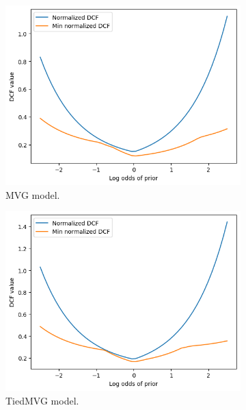 \documentclass{article}
\begin{document}
\begin{figure}[ht]
    \centering
    \begin{subfigure}[b]{0.3\textwidth}
        \centering
        \includegraphics[width=\textwidth]{images/bayes_error_mvg.png}
        \caption{MVG model.}
    \end{subfigure}
    \hfill
    \begin{subfigure}[b]{0.3\textwidth}
        \centering
        \includegraphics[width=\textwidth]{images/bayes_error_tiedmvg.png}
        \caption{TiedMVG model.}
    \end{subfigure}
    \hfill
    \begin{subfigure}[b]{0.3\textwidth}
        \centering

\end{subfigure}
\end{figure}
\end{document}
